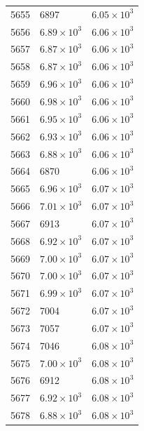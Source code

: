 \begin{table}[H]
\begin{tabular}{lll}
5655 & 6897 & $\displaystyle 6.05 \times 10^{3}$ \\
5656 & $\displaystyle 6.89 \times 10^{3}$ & $\displaystyle 6.06 \times 10^{3}$ \\
5657 & $\displaystyle 6.87 \times 10^{3}$ & $\displaystyle 6.06 \times 10^{3}$ \\
5658 & $\displaystyle 6.87 \times 10^{3}$ & $\displaystyle 6.06 \times 10^{3}$ \\
5659 & $\displaystyle 6.96 \times 10^{3}$ & $\displaystyle 6.06 \times 10^{3}$ \\
5660 & $\displaystyle 6.98 \times 10^{3}$ & $\displaystyle 6.06 \times 10^{3}$ \\
5661 & $\displaystyle 6.95 \times 10^{3}$ & $\displaystyle 6.06 \times 10^{3}$ \\
5662 & $\displaystyle 6.93 \times 10^{3}$ & $\displaystyle 6.06 \times 10^{3}$ \\
5663 & $\displaystyle 6.88 \times 10^{3}$ & $\displaystyle 6.06 \times 10^{3}$ \\
5664 & 6870 & $\displaystyle 6.06 \times 10^{3}$ \\
5665 & $\displaystyle 6.96 \times 10^{3}$ & $\displaystyle 6.07 \times 10^{3}$ \\
5666 & $\displaystyle 7.01 \times 10^{3}$ & $\displaystyle 6.07 \times 10^{3}$ \\
5667 & 6913 & $\displaystyle 6.07 \times 10^{3}$ \\
5668 & $\displaystyle 6.92 \times 10^{3}$ & $\displaystyle 6.07 \times 10^{3}$ \\
5669 & $\displaystyle 7.00 \times 10^{3}$ & $\displaystyle 6.07 \times 10^{3}$ \\
5670 & $\displaystyle 7.00 \times 10^{3}$ & $\displaystyle 6.07 \times 10^{3}$ \\
5671 & $\displaystyle 6.99 \times 10^{3}$ & $\displaystyle 6.07 \times 10^{3}$ \\
5672 & 7004 & $\displaystyle 6.07 \times 10^{3}$ \\
5673 & 7057 & $\displaystyle 6.07 \times 10^{3}$ \\
5674 & 7046 & $\displaystyle 6.08 \times 10^{3}$ \\
5675 & $\displaystyle 7.00 \times 10^{3}$ & $\displaystyle 6.08 \times 10^{3}$ \\
5676 & 6912 & $\displaystyle 6.08 \times 10^{3}$ \\
5677 & $\displaystyle 6.92 \times 10^{3}$ & $\displaystyle 6.08 \times 10^{3}$ \\
5678 & $\displaystyle 6.88 \times 10^{3}$ & $\displaystyle 6.08 \times 10^{3}$ \\

\end{tabular}
\end{table}
